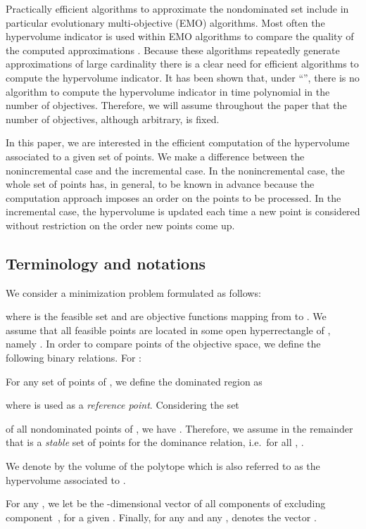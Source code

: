 \documentclass[a4paper,11pt]{article}
\begin{document}
Practically efficient algorithms to approximate the nondominated set include in particular
evolutionary multi-objective (EMO) algorithms.
Most often the hypervolume indicator is used within EMO algorithms 
to compare the quality 
of the computed approximations \citep{BeuNauEmm07, WagBeuNau07}.
Because these algorithms repeatedly generate
approximations of large cardinality there is a clear need for efficient algorithms 
to compute the hypervolume indicator.
It has been shown \citep{BriFri10} that, under ``'', 
there is no algorithm to compute the hypervolume indicator in time polynomial 
in the number of objectives. 
Therefore, we will assume throughout the paper that the number of objectives, 
although arbitrary, is fixed.

In this paper, we are interested in the efficient computation 
of the hypervolume associated to a given set of points.
We make a difference between the nonincremental case
and the incremental case.
In the nonincremental case, 
the whole set of points has, in general, to be known in advance
because the computation approach imposes an order on the points to be processed.
In the incremental case, the hypervolume is updated each time a new point is considered
without restriction on the order new points come up.


\subsection{Terminology and notations}

We consider a minimization problem formulated as follows:

where  is the feasible set and 
 are  objective functions mapping from  to .
We assume that all feasible points  are located 
in some open hyperrectangle of ,
namely .
In order to compare points of the objective space, 
we define the following binary relations. For :

For any set  of points of , we define the dominated region as

where  is used as a \emph{reference point}.
Considering the set 

of all nondominated points of , 
we have . 
Therefore, we assume in the remainder that  is a \emph{stable} set of points 
for the dominance relation,
i.e.\ for all , .

We denote by  the volume of the polytope  
which is also referred to as the hypervolume 
associated to .

For any , we let  be the -dimensional
vector of all components of  excluding component~, for a given
. 
Finally, for any  and any , 
denotes the vector .
\end{document}
